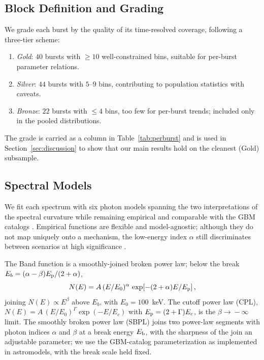 \documentclass[twocolumn]{aastex631}
\newcommand{\Ep}{\ensuremath{E_{\rm p}}}
\begin{document}
\subsection{Block Definition and Grading} \label{sec:grade}
We grade each burst by the quality of its time-resolved coverage, following a
three-tier scheme:
\begin{enumerate}
\item \emph{Gold}: $40$ bursts with $\ge10$ well-constrained
  bins, suitable for per-burst parameter relations.
\item \emph{Silver}: $44$ bursts with $5$--$9$ bins, contributing to
  population statistics with caveats.
\item \emph{Bronze}: $22$ bursts with $\le4$ bins, too few for per-burst
  trends; included only in the pooled distributions.
\end{enumerate}
The grade is carried as a column in Table~\ref{tab:perburst} and is used in
Section~\ref{sec:discussion} to show that our main results hold on the cleanest
(Gold) subsample.

\subsection{Spectral Models} \label{sec:models}
We fit each spectrum with six photon models spanning the two interpretations of
the spectral curvature while remaining empirical and comparable with the GBM
catalogs \citep[e.g.,][]{Kaneko2006,Gruber2014}. Empirical functions are flexible
and model-agnostic; although they do not map uniquely onto a mechanism, the
low-energy index $\alpha$ still discriminates between scenarios at high
significance \citep[e.g.,][]{Acuner2020}.

The Band function \citep{Band1993} is a smoothly-joined broken power law; below
the break $E_b=(\alpha-\beta)\Ep/(2+\alpha)$,
\begin{equation}
N(E)=A\,(E/E_0)^{\alpha}\,\exp\!\left[-(2+\alpha)E/\Ep\right],
\end{equation}
joining $N(E)\propto E^{\beta}$ above $E_b$, with $E_0=100$~keV. The cutoff power
law (CPL), $N(E)=A\,(E/E_0)^{\Gamma}\exp(-E/E_c)$ with $\Ep=(2+\Gamma)E_c$, is the
$\beta\!\to\!-\infty$ limit. The smoothly broken power law (SBPL) joins two
power-law segments with photon indices $\alpha$ and $\beta$ at a break energy
$E_{\rm b}$, with the sharpness of the join an adjustable parameter; we use
the GBM-catalog parameterization \citep{Kaneko2006} as implemented in
\textsf{astromodels}, with the break scale held fixed.
\end{document}
